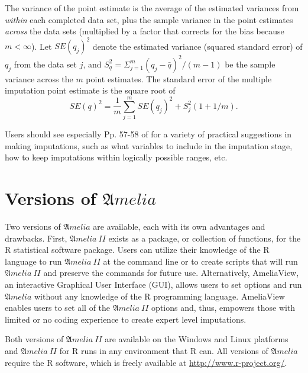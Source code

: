 \documentclass[12pt,titlepage]{article}
\newcommand{\Amelia}{\ensuremath{\mathfrak Amelia} }
\newcommand{\AmeliaII}{\ensuremath{\mathfrak Amelia~II} }
\begin{document}
The variance of the point estimate is the average of the estimated
variances from \emph{within} each completed data set, plus the sample
variance in the point estimates \emph{across} the data sets
(multiplied by a factor that corrects for the bias because
$m<\infty$).  Let $SE(q_j)^2$ denote the estimated variance (squared
standard error) of $q_j$ from the data set $j$, and
$S^{2}_{q}=\Sigma^{m}_{j=1}(q_j-\bar{q})^2/(m-1)$ be the sample
variance across the $m$ point estimates.  The standard error of the
multiple imputation point estimate is the square root of
\begin{equation}
SE(q)^2=\frac{1}{m}\sum^{m}_{j=1}SE(q_j)^2+S^{2}_{j}(1+1/m).
\end{equation}

Users should see especially Pp. 57-58 of \citet{KinHonJos01} for a
variety of practical suggestions in making imputations, such as what
variables to include in the imputation stage, how to keep imputations
within logically possible ranges, etc.

\section{Versions of ${\mathfrak Amelia}$}
\label{sec:versions}
Two versions of \Amelia are available, each with its own advantages
and drawbacks.  First, \AmeliaII exists as a package, or collection of
functions, for the R statistical software package.  Users can utilize
their knowledge of the R language to run \AmeliaII at the command line
or to create scripts that will run \AmeliaII and preserve the commands
for future use.  Alternatively, AmeliaView, an interactive Graphical
User Interface (GUI), allows users to set options and run \Amelia
without any knowledge of the R programming language.  AmeliaView
enables users to set all of the \AmeliaII options and, thus, empowers
those with limited or no coding experience to create expert level
imputations.

Both versions of \AmeliaII are available on the Windows and Linux
platforms and \AmeliaII for R runs in any environment that R can.  All
versions of ${\mathfrak Amelia}$ require the R software, which is
freely available at \url{http://www.r-project.org/}.
\end{document}
